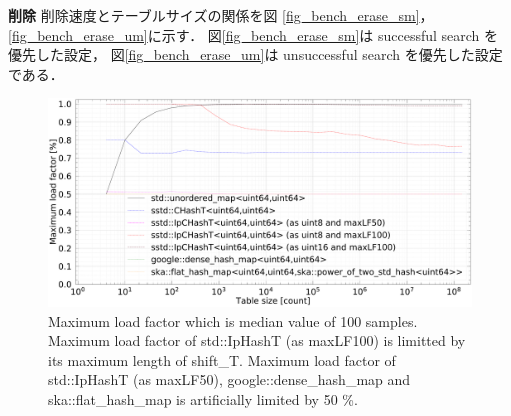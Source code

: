 %
{\bf 削除}
\samepage\newline\indent
削除速度とテーブルサイズの関係を図
\ref{fig_bench_erase_sm}，
\ref{fig_bench_erase_um}に示す．
図\ref{fig_bench_erase_sm}は successful search を優先した設定，
図\ref{fig_bench_erase_um}は unsuccessful search を優先した設定である．
\leavevmode \newline







\begin{figure}[b]
  \includegraphics[scale=0.24]{./fig_bench/maxLoadFactor_med.pdf}
  \caption{
    Maximum load factor which is median value of 100 samples.
    Maximum load factor of std::IpHashT (as maxLF100) is limitted by its maximum length of shift\_T.
    Maximum load factor of std::IpHashT (as maxLF50), google::dense\_hash\_map and ska::flat\_hash\_map is artificially limited by 50 \%.
  }
  \label{fig_bench_LF}
\end{figure}

